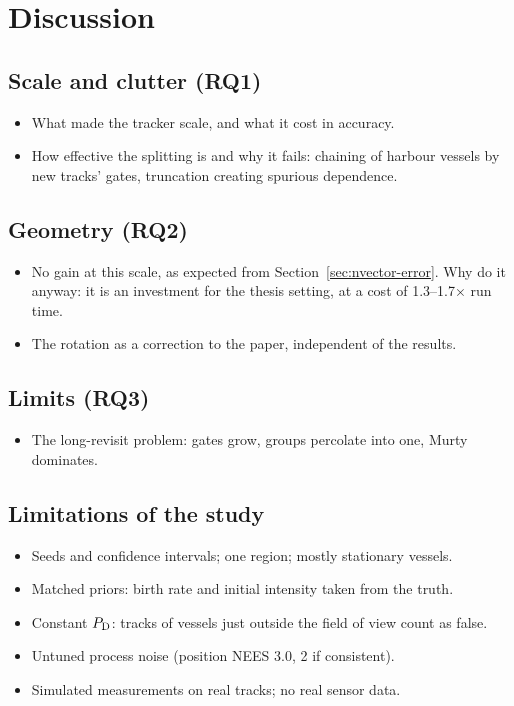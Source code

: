 \section{Discussion}
\label{sec:discussion}

\subsection{Scale and clutter (RQ1)}
\begin{itemize}
    \item What made the tracker scale, and what it cost in accuracy.
    \item How effective the splitting is and why it fails: chaining of harbour vessels by new tracks' gates, truncation creating spurious dependence.
\end{itemize}

\subsection{Geometry (RQ2)}
\begin{itemize}
    \item No gain at this scale, as expected from Section~\ref{sec:nvector-error}. Why do it anyway: it is an investment for the thesis setting, at a cost of 1.3--1.7$\times$ run time.
    \item The rotation as a correction to the paper, independent of the results.
\end{itemize}

\subsection{Limits (RQ3)}
\begin{itemize}
    \item The long-revisit problem: gates grow, groups percolate into one, Murty dominates.
\end{itemize}

\subsection{Limitations of the study}
\begin{itemize}
    \item Seeds and confidence intervals; one region; mostly stationary vessels.
    \item Matched priors: birth rate and initial intensity taken from the truth.
    \item Constant $P_{\mathrm{D}}$: tracks of vessels just outside the field of view count as false.
    \item Untuned process noise (position NEES 3.0, 2 if consistent).
    \item Simulated measurements on real tracks; no real sensor data.
\end{itemize}
